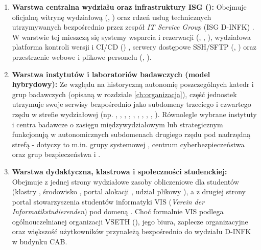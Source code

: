 \begin{enumerate}
    \item \textbf{Warstwa centralna wydziału oraz infrastruktury ISG ():} Obejmuje oficjalną witrynę wydziałową (, ) oraz rdzeń usług technicznych utrzymywanych bezpośrednio przez zespół \textit{IT Service Group} (ISG D-INFK) \cite{isg_dinfk_wiki}. W warstwie tej mieszczą się systemy wsparcia i rezerwacji (, , ), wydziałowa platforma kontroli wersji i CI/CD () \cite{gitlab_dinfk}, serwery dostępowe SSH/SFTP (, ) oraz przestrzenie webowe i plikowe personelu (, ).
    \item \textbf{Warstwa instytutów i laboratoriów badawczych (model hybrydowy):} Ze względu na historyczną autonomię poszczególnych katedr i grup badawczych (opisaną w rozdziale \ref{ch:organizacja}), część jednostek utrzymuje swoje serwisy bezpośrednio jako subdomeny trzeciego i czwartego rzędu w strefie wydziałowej (np. , , , , , , , , , ). Równolegle wybrane instytuty i centra badawcze o zasięgu międzywydziałowym lub strategicznym funkcjonują w autonomicznych subdomenach drugiego rzędu pod nadrzędną strefą  - dotyczy to m.in. grupy systemowej , centrum cyberbezpieczeństwa  \cite{eth_zisc} oraz grup bezpieczeństwa  i .
    \item \textbf{Warstwa dydaktyczna, klastrowa i społeczności studenckiej:} Obejmuje z jednej strony wydziałowe zasoby obliczeniowe dla studentów (klastry , środowisko , portal alokacji , udział plikowy ), a z drugiej strony portal stowarzyszenia studentów informatyki VIS (\textit{Verein der Informatikstudierenden}) pod domeną  \cite{vis_ethz}. Choć formalnie VIS podlega ogólnouczelnianej organizacji VSETH (), jego biura, zaplecze organizacyjne oraz większość użytkowników przynależą bezpośrednio do wydziału D-INFK w budynku CAB.
\end{enumerate}

